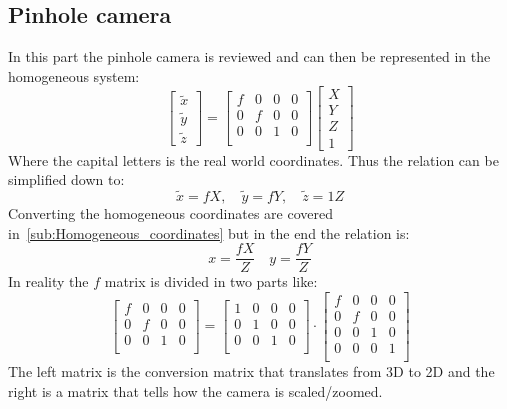 \subsection{Pinhole camera}%
\label{sub:bg:pinhole_camera}
In this part the pinhole camera is reviewed and can then be represented in the homogeneous system:
\begin{equation}
    \begin{bmatrix}
        \tilde{x}\\\tilde{y} \\ \tilde{z}
    \end{bmatrix}
    =
    \begin{bmatrix}
        f & 0 & 0 & 0\\
        0 & f & 0 & 0\\
        0 & 0 & 1 & 0\\
    \end{bmatrix}
    \begin{bmatrix}
        X\\ Y \\ Z \\ 1
    \end{bmatrix}
\end{equation}
Where the capital letters is the real world coordinates.
Thus the relation can be simplified down to:
\begin{equation}
    \tilde{x} = fX, \quad \tilde{y} = fY, \quad \tilde{z}=1Z
\end{equation}
Converting the homogeneous coordinates are covered in~\ref{sub:Homogeneous_coordinates} but in the end the relation is:
\begin{equation}
    x = \frac{fX}{Z}  \quad y = \frac{fY}{Z}
\end{equation}
In reality the $f$ matrix is divided in two parts like:
\begin{equation}\label{eq:intrinsic_params}
    \begin{bmatrix}
        f & 0 & 0 & 0\\
        0 & f & 0 & 0\\
        0 & 0 & 1 & 0\\
    \end{bmatrix} =
    \begin{bmatrix}
        1 & 0 & 0 & 0\\
        0 & 1 & 0 & 0\\
        0 & 0 & 1 & 0\\
    \end{bmatrix}\cdot
    \begin{bmatrix}
        f & 0 & 0 & 0\\
        0 & f & 0 & 0\\
        0 & 0 & 1 & 0\\
        0 & 0 & 0 & 1\\
    \end{bmatrix}
\end{equation}
The left matrix is the conversion matrix that translates from 3D to 2D and the right is a matrix that tells how the camera is scaled/zoomed.



